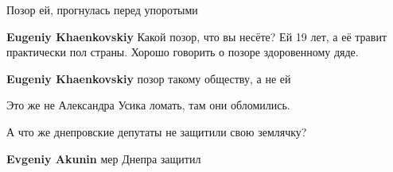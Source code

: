 \begin{itemize}
Позор ей, прогнулась перед упоротыми

\begin{itemize}
 
\textbf{Eugeniy Khaenkovskiy} Какой позор, что вы несёте? Ей 19 лет, а её травит практически пол страны. Хорошо говорить о позоре здоровенному дяде.

 
\textbf{Eugeniy Khaenkovskiy} позор такому обществу, а не ей
\end{itemize}

 
Это же не Александра Усика ломать, там они обломились.

 
А что же днепровские депутаты не защитили свою землячку?🤔

\begin{itemize}
 
\textbf{Evgeniy Akunin} мер Днепра защитил

 

\end{itemize}
\end{itemize}

